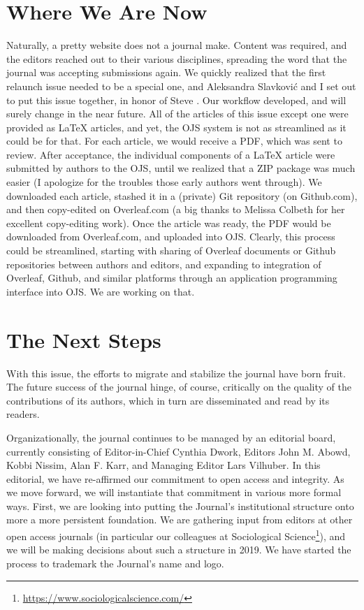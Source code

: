 \documentclass{jpcfinal} %
\newcommand{\urlcite}[2]{#2\footnote{\url{#1}}}
\begin{document}
\section{Where We Are Now}
Naturally, a pretty website does not a journal make. Content was required, and the editors reached out to their various disciplines, spreading the word that the journal was accepting submissions again. We quickly realized that the first relaunch issue needed to be a special one, and Aleksandra Slavkovi\'c and I set out to put this issue together, in honor of Steve \citep{SesaLarsEditorial}. Our workflow developed, and will surely change in the near future. All of the articles of this issue except one were provided as \LaTeX{} articles, and yet, the OJS system is not as streamlined as it could be for that. For each article, we would receive a PDF, which was sent to review. After acceptance, the individual components of a \LaTeX{} article were submitted by authors to the OJS, until we realized that a ZIP package was much easier (I apologize for the troubles those early authors went through). We downloaded each article, stashed it in a (private) Git repository (on Github.com), and then copy-edited on Overleaf.com (a big thanks to Melissa Colbeth for her excellent copy-editing work). Once the article was ready, the PDF would be downloaded from Overleaf.com, and uploaded into OJS. Clearly, this process could be streamlined, starting with sharing of Overleaf documents or Github repositories between authors and editors, and expanding to  integration of Overleaf, Github, and similar platforms through an application programming interface into OJS. We are working on that. 

\section{The Next Steps}

With this issue, the efforts to migrate and stabilize the journal have born fruit. The future success of the journal hinge, of course, critically on the quality of the contributions of its authors, which in turn are disseminated and read by its readers.

Organizationally, the journal continues to be managed by an editorial board, currently consisting of Editor-in-Chief 
Cynthia Dwork, Editors 
John M. Abowd, 
Kobbi Nissim, 
Alan F. Karr, and 
Managing Editor
Lars Vilhuber. In this editorial, we have re-affirmed our commitment to open access and integrity. As we move forward, we will instantiate that commitment in various more formal ways. First, we are looking into putting the Journal's institutional structure onto more a more persistent foundation. We are gathering  input from editors at other open access journals (in particular our colleagues at \urlcite{https://www.sociologicalscience.com/}{Sociological Science}), and we will be making decisions about such a structure in 2019. We have started the process to trademark the Journal's name and logo.
\end{document}
